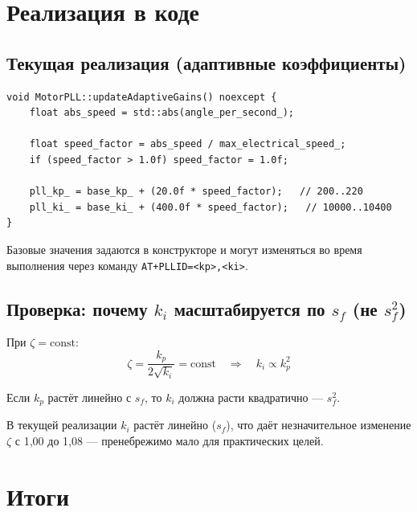 \documentclass[12pt,a4paper]{article}
\begin{document}
\section{Реализация в коде}

\subsection{Текущая реализация (адаптивные коэффициенты)}

\begin{verbatim}
void MotorPLL::updateAdaptiveGains() noexcept {
    float abs_speed = std::abs(angle_per_second_);

    float speed_factor = abs_speed / max_electrical_speed_;
    if (speed_factor > 1.0f) speed_factor = 1.0f;

    pll_kp_ = base_kp_ + (20.0f * speed_factor);   // 200..220
    pll_ki_ = base_ki_ + (400.0f * speed_factor);   // 10000..10400
}
\end{verbatim}

Базовые значения задаются в конструкторе и могут изменяться
во время выполнения через команду \texttt{AT+PLLID=<kp>,<ki>}.

\subsection{Проверка: почему $k_i$ масштабируется по $s_f$ (не $s_f^2$)}

При $\zeta = \text{const}$:
\begin{equation*}
  \zeta = \frac{k_p}{2\sqrt{k_i}} = \text{const}
  \quad\Longrightarrow\quad
  k_i \propto k_p^2
\end{equation*}

Если $k_p$ растёт линейно с $s_f$, то $k_i$ должна расти
квадратично --- $s_f^2$.

В текущей реализации $k_i$ растёт линейно ($s_f$), что даёт
незначительное изменение $\zeta$ с 1{,}00 до 1{,}08 ---
пренебрежимо мало для практических целей.

\section{Итоги}
\end{document}
